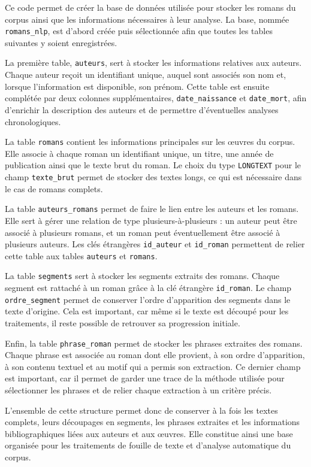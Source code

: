 Ce code permet de créer la base de données utilisée pour stocker les romans du corpus ainsi que les informations nécessaires à leur analyse. La base, nommée \texttt{romans\_nlp}, est d'abord créée puis sélectionnée afin que toutes les tables suivantes y soient enregistrées.

La première table, \texttt{auteurs}, sert à stocker les informations relatives aux auteurs. Chaque auteur reçoit un identifiant unique, auquel sont associés son nom et, lorsque l'information est disponible, son prénom. Cette table est ensuite complétée par deux colonnes supplémentaires, \texttt{date\_naissance} et \texttt{date\_mort}, afin d'enrichir la description des auteurs et de permettre d'éventuelles analyses chronologiques.

La table \texttt{romans} contient les informations principales sur les œuvres du corpus. Elle associe à chaque roman un identifiant unique, un titre, une année de publication ainsi que le texte brut du roman. Le choix du type \texttt{LONGTEXT} pour le champ \texttt{texte\_brut} permet de stocker des textes longs, ce qui est nécessaire dans le cas de romans complets.

La table \texttt{auteurs\_romans} permet de faire le lien entre les auteurs et les romans. Elle sert à gérer une relation de type plusieurs-à-plusieurs : un auteur peut être associé à plusieurs romans, et un roman peut éventuellement être associé à plusieurs auteurs. Les clés étrangères \texttt{id\_auteur} et \texttt{id\_roman} permettent de relier cette table aux tables \texttt{auteurs} et \texttt{romans}.

La table \texttt{segments} sert à stocker les segments extraits des romans. Chaque segment est rattaché à un roman grâce à la clé étrangère \texttt{id\_roman}. Le champ \texttt{ordre\_segment} permet de conserver l'ordre d'apparition des segments dans le texte d'origine. Cela est important, car même si le texte est découpé pour les traitements, il reste possible de retrouver sa progression initiale.

Enfin, la table \texttt{phrase\_roman} permet de stocker les phrases extraites des romans. Chaque phrase est associée au roman dont elle provient, à son ordre d'apparition, à son contenu textuel et au motif qui a permis son extraction. Ce dernier champ est important, car il permet de garder une trace de la méthode utilisée pour sélectionner les phrases et de relier chaque extraction à un critère précis.

L'ensemble de cette structure permet donc de conserver à la fois les textes complets, leurs découpages en segments, les phrases extraites et les informations bibliographiques liées aux auteurs et aux œuvres. Elle constitue ainsi une base organisée pour les traitements de fouille de texte et d'analyse automatique du corpus.


